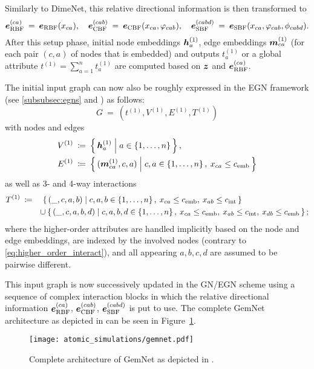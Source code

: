 Similarly to DimeNet, this relative directional information is then transformed to
\[
    \boldsymbol{e}_{\text{RBF}}^{(ca)} \: = \: \boldsymbol{e}_{\text{RBF}}(x_{ca}), 
    \quad \boldsymbol{e}_{\text{CBF}}^{(cab)} \: = \: \boldsymbol{e}_{\text{CBF}}(x_{ca}, \varphi_{cab}),
    \quad \boldsymbol{e}_{\text{SBF}}^{(cabd)} \: = \: \boldsymbol{e}_{\text{SBF}}(x_{ca}, \varphi_{cab}, \phi_{cabd}) 
    \text{.}
\]
After this setup phase, initial node embeddings $\boldsymbol{h}_{a}^{(1)}$, edge embeddings 
$\boldsymbol{m}_{ca}^{(1)}$ (for each pair $(c, a)$ of nodes that is embedded) and outputs
$t_{a}^{(1)}$ or a global attribute $t^{(1)} = \sum_{a=1}^n t_a^{(1)}$
are computed based on $\boldsymbol{z}$ and $\boldsymbol{e}_{\text{RBF}}^{(ca)}$. 

The initial input graph can now also be roughly expressed in the
EGN framework (see \ref{subsubsec:egns} and 
\cite{https://doi.org/10.48550/arxiv.2203.09697}) as follows:
\[
    G \: = \: (t^{(1)}, V^{(1)}, E^{(1)}, T^{(1)})
\]
with nodes and edges
\begin{align*}
    V^{(1)} \: &\coloneqq \: 
    \left\{\, \boldsymbol{h}_{a}^{(1)} \; \middle| \; a \in \left\{1, \dots, n\right\} \,\right\}, \\
    E^{(1)} \: &\coloneqq \: 
    \left\{\, (\boldsymbol{m}_{ca}^{(1)}, c, a) \; \middle| \; c, a \in \left\{1, \dots, n\right\}, \: x_{ca} \leq c_{\text{emb}} \,\right\}
\end{align*}
as well as 3- and 4-way interactions
\begin{align*}
    T^{(1)} \: &\coloneqq \quad 
    \left\{\, (\_, c, a, b) \; \middle| \; c, a, b \in \left\{1, \dots, n\right\}, 
    \: x_{ca} \leq c_{\text{emb}}, \: x_{ab} \leq c_{\text{int}} \,\right\} \\
    &\qquad \cup  \left\{\, (\_, c, a, b, d) \; \middle| \; c, a, b, d \in \left\{1, \dots, n\right\}, 
    \: x_{ca} \leq c_{\text{emb}}, \: x_{ab} \leq c_{\text{int}}, 
    \: x_{db} \leq c_{\text{emb}} \,\right\};
\end{align*}
where the higher-order attributes are handled implicitly 
based on the node and edge embeddings, are indexed by the involved nodes (contrary 
to \eqref{eq:higher_order_interact}), and all appearing $a, b, c, d$ are assumed to be 
pairwise different.

This input graph is now successively updated in the GN/EGN scheme using a sequence of 
complex interaction blocks in which the relative directional information 
$\boldsymbol{e}_{\text{RBF}}^{(ca)}$, $\boldsymbol{e}_{\text{CBF}}^{(cab)}$, $\boldsymbol{e}_{\text{SBF}}^{(cabd)}$ 
is put to use. The complete GemNet architecture as depicted in 
\cite{https://doi.org/10.48550/arxiv.2106.08903} can be seen in Figure~\ref{fig:gemnet}.

\begin{figure}[H]
    \centering
    \texttt{[image: atomic\_simulations/gemnet.pdf]}
    \caption{Complete architecture of GemNet as depicted in 
    \cite[Appendix F]{https://doi.org/10.48550/arxiv.2106.08903}.}
    \label{fig:gemnet}
\end{figure}
